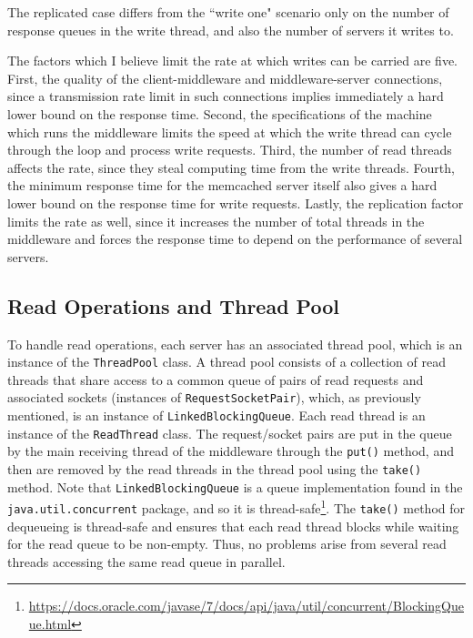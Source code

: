 \documentclass[11pt]{article}
\begin{document}
The replicated case differs from the ``write one" scenario only on the number of response queues in the write thread, and also the number of servers it writes to.

The factors which I believe limit the rate at which writes can be carried are five. First, the quality of the client-middleware and middleware-server connections, since a transmission rate limit in such connections implies immediately a hard lower bound on the response time. Second, the specifications of the machine which runs the middleware limits the speed at which the write thread can cycle through the loop and process write requests. Third, the number of read threads affects the rate, since they steal computing time from the write threads. Fourth, the minimum response time for the memcached server itself also gives a hard lower bound on the response time for write requests. Lastly, the replication factor limits the rate as well, since it increases the number of total threads in the middleware and forces the response time to depend on the performance of several servers.

%
%

\subsection{Read Operations and Thread Pool}\label{sec:desc:reads}

To handle read operations, each server has an associated thread pool, which is an instance of the \texttt{ThreadPool} class. A thread pool consists of a collection of read threads that share access to a common queue of pairs of read requests and associated sockets (instances of \texttt{RequestSocketPair}), which, as previously mentioned, is an instance of \texttt{LinkedBlockingQueue}. Each read thread is an instance of the \texttt{ReadThread} class. The request/socket pairs are put in the queue by the main receiving thread of the middleware through the \texttt{put()} method, and then are removed by the read threads in the thread pool using the \texttt{take()} method. Note that \texttt{LinkedBlockingQueue} is a queue implementation found in the \texttt{java.util.concurrent} package, and so it is thread-safe\footnote{\url{https://docs.oracle.com/javase/7/docs/api/java/util/concurrent/BlockingQueue.html}}. The \texttt{take()} method for dequeueing is thread-safe and ensures that each read thread blocks while waiting for the read queue to be non-empty. Thus, no problems arise from several read threads accessing the same read queue in parallel.
\end{document}
